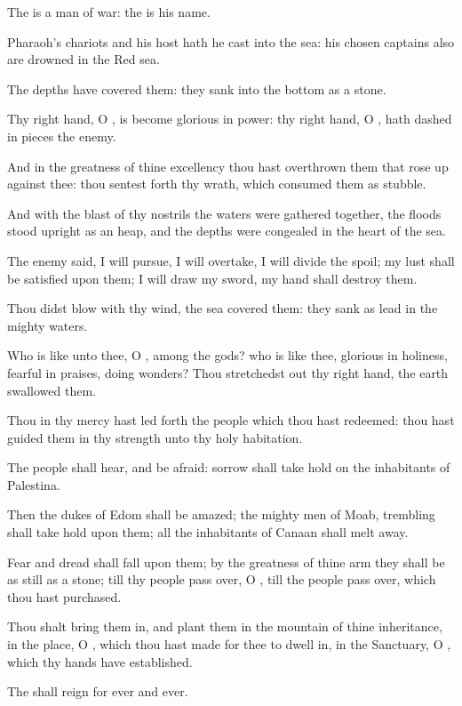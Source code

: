 \Verse The \LORD is a man of war: the \LORD is his name.

\Verse Pharaoh's chariots and his host hath he cast into the sea: his chosen captains also are drowned in the Red sea.

\Verse The depths have covered them: they sank into the bottom as a stone.

\Verse Thy right hand, O \LORD, is become glorious in power: thy right hand, O \LORD, hath dashed in pieces the enemy.

\Verse And in the greatness of thine excellency thou hast overthrown them that rose up against thee: thou sentest forth thy wrath, which consumed them as stubble.

\Verse And with the blast of thy nostrils the waters were gathered together, the floods stood upright as an heap, and the depths were congealed in the heart of the sea.

\Verse The enemy said, I will pursue, I will overtake, I will divide the spoil; my lust shall be satisfied upon them; I will draw my sword, my hand shall destroy them.

\Verse Thou didst blow with thy wind, the sea covered them: they sank as lead in the mighty waters.

\Verse Who is like unto thee, O \LORD, among the gods? who is like thee, glorious in holiness, fearful in praises, doing wonders?  \Verse Thou stretchedst out thy right hand, the earth swallowed them.

\Verse Thou in thy mercy hast led forth the people which thou hast redeemed: thou hast guided them in thy strength unto thy holy habitation.

\Verse The people shall hear, and be afraid: sorrow shall take hold on the inhabitants of Palestina.

\Verse Then the dukes of Edom shall be amazed; the mighty men of Moab, trembling shall take hold upon them; all the inhabitants of Canaan shall melt away.

\Verse Fear and dread shall fall upon them; by the greatness of thine arm they shall be as still as a stone; till thy people pass over, O \LORD, till the people pass over, which thou hast purchased.

\Verse Thou shalt bring them in, and plant them in the mountain of thine inheritance, in the place, O \LORD, which thou hast made for thee to dwell in, in the Sanctuary, O \LORD, which thy hands have established.

\Verse The \LORD shall reign for ever and ever.

